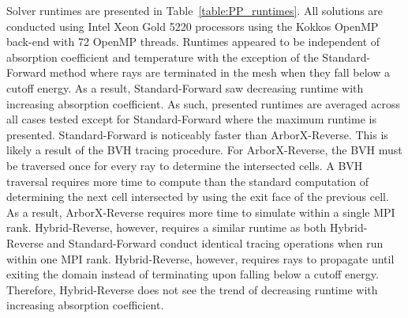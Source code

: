 Solver runtimes are presented in Table~\ref{table:PP_runtimes}. All solutions are conducted using Intel Xeon Gold 5220 processors using the Kokkos OpenMP back-end with 72 OpenMP threads. Runtimes appeared to be independent of absorption coefficient and temperature with the exception of the Standard-Forward method where rays are terminated in the mesh when they fall below a cutoff energy. As a result, Standard-Forward saw decreasing runtime with increasing absorption coefficient. As such, presented runtimes are averaged across all cases tested except for Standard-Forward where the maximum runtime is presented. Standard-Forward is noticeably faster than ArborX-Reverse. This is likely a result of the BVH tracing procedure. For ArborX-Reverse, the BVH must be traversed once for every ray to determine the intersected cells. A BVH traversal requires more time to compute than the standard computation of determining the next cell intersected by using the exit face of the previous cell. As a result, ArborX-Reverse requires more time to simulate within a single MPI rank. Hybrid-Reverse, however, requires a similar runtime as both Hybrid-Reverse and Standard-Forward conduct identical tracing operations when run within one MPI rank. Hybrid-Reverse, however, requires rays to propagate until exiting the domain instead of terminating upon falling below a cutoff energy. Therefore, Hybrid-Reverse does not see the trend of decreasing runtime with increasing absorption coefficient.

